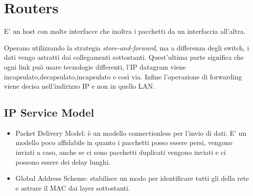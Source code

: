 \section{Routers}
\begin{definition}
  E' un host con molte interfacce che inoltra i pacchetti da un interfaccia all'altra.
\end{definition}
Operano utilizzando la strategia \textit{store-and-forward}, ma a differenza degli switch, i dati vengo astratti dai collegamenti sottostanti. Quest'ultima parte significa che ogni link può usare tecnologie differenti, l'IP datagram viene incapsulato,decapsulato,incapsulato e così via. Infine l'operazione di forwarding viene decisa nell'indirizzo IP e non in quello LAN.
\subsection{IP Service Model}
\begin{itemize}
  \item Packet Delivery Model: è un modello connectionless per l'invio di dati. E' un modello poco affidabile in quanto i pacchetti posso essere persi, vengono inviati a caso, anche se ci sono pacchetti duplicati vengono inviati e ci possono essere dei delay lunghi.
  \item Global Address Scheme: stabilisce un modo per identificare tutti gli della rete e astrare il MAC dai layer sottostanti.
\end{itemize}
